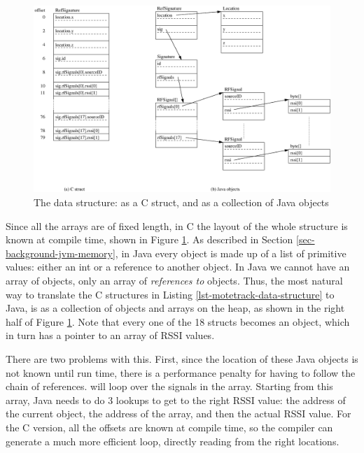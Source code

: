 \begin{figure}
\centering
\includegraphics[width=0.9\linewidth]{motetrack-refsignature-objects}
\caption[The  data structure]{The  data structure: as a C struct, and as a collection of Java objects}
\label{fig-motetrack-refsignature-objects}
\end{figure}

Since all the arrays are of fixed length, in C the layout of the whole structure is known at compile time, shown in Figure \ref{fig-motetrack-refsignature-objects}. As described in Section \ref{sec-background-jvm-memory}, in Java every object is made up of a list of primitive values: either an int or a reference to another object. In Java we cannot have an array of objects, only an array of \emph{references to} objects. Thus, the most natural way to translate the C structures in Listing \ref{lst-motetrack-data-structure} to Java, is as a collection of objects and arrays on the heap, as shown in the right half of Figure \ref{fig-motetrack-refsignature-objects}. Note that every one of the 18  structs becomes an object, which in turn has a pointer to an array of RSSI values.

There are two problems with this. First, since the location of these Java objects is not known until run time, there is a performance penalty for having to follow the chain of references.  will loop over the signals in the  array. Starting from this array, Java needs to do 3 lookups to get to the right RSSI value: the address of the current  object, the address of the  array, and then the actual RSSI value. For the C version, all the offsets are known at compile time, so the compiler can generate a much more efficient loop, directly reading from the right locations.

